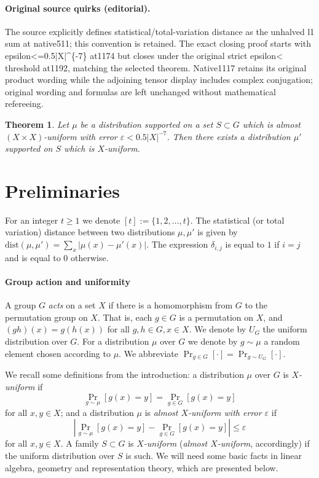 \documentclass[10pt]{article}
\newtheorem{theorem}{Theorem}[section]
\theoremstyle{definition}
\numberwithin{equation}{section}
\def\eps{\varepsilon}
\def\sd{\textrm{dist}}
\begin{document}
\paragraph{Original source quirks (editorial).} The source explicitly defines statistical/total-variation distance as the unhalved l1 sum at native511; this convention is retained. The exact closing proof starts with epsilon<=0.5|X|\textasciicircum{}\{-7\} at1174 but closes under the original strict epsilon< threshold at1192, matching the selected theorem. Native1117 retains its original product wording while the adjoining tensor display includes complex conjugation; original wording and formulas are left unchanged without mathematical refereeing.
\endgroup
\clearpage
\setcounter{section}{1}\setcounter{theorem}{5}
\begin{theorem}\label{thm:almost_support_uniform}
Let $\mu$ be a distribution supported on a set $S \subset G$ which is
almost $(X \times X)$-uniform with error $\eps < 0.5 |X|^{-7}$. Then
there exists a distribution $\mu'$ supported on $S$ which is $X$-uniform.
\end{theorem}
\setcounter{section}{1}
\section{Preliminaries}
\label{sec:prelim}

For an integer $t \ge 1$ we denote $[t]:=\{1,2,\ldots,t\}$. The statistical (or total variation) distance between two distributions $\mu,\mu'$ is
given by $\sd(\mu,\mu')=\sum_{x} |\mu(x)-\mu'(x)|$. The expression $\delta_{i,j}$ is equal to $1$ if $i=j$ and is equal to $0$ otherwise.



\paragraph{Group action and uniformity}
A group $G$ \emph{acts} on a set $X$ if there is a homomorphism from $G$ to the
permutation group on $X$. That is, each $g \in G$ is a permutation on $X$,
and $(gh)(x)=g(h(x))$ for all $g,h \in G, x \in X$. We denote by $U_G$
the uniform distribution over $G$. For a distribution $\mu$ over $G$ we denote
by $g \sim \mu$ a random element chosen according to $\mu$. We abbreviate $\Pr_{g \in G}[\cdot] = \Pr_{g \sim U_G}[\cdot]$.

We recall some definitions from the
introduction: a distribution $\mu$ over $G$ is \emph{$X$-uniform} if
$$
\Pr_{g \sim \mu}[g(x)=y] = \Pr_{g \in G}[g(x)=y]
$$
for all $x,y \in X$; and a distribution $\mu$ is
\emph{almost $X$-uniform with error $\eps$} if
$$
\left| \Pr_{g \sim \mu}[g(x)=y] -
\Pr_{g \in G}[g(x)=y] \right| \le \eps
$$
for all $x,y \in X$. A family $S \subset G$ is \emph{$X$-uniform} (\emph{almost
$X$-uniform}, accordingly) if the uniform distribution over $S$ is such. We will need
some basic facts in linear algebra, geometry and representation theory,
which are presented below.
\end{document}
